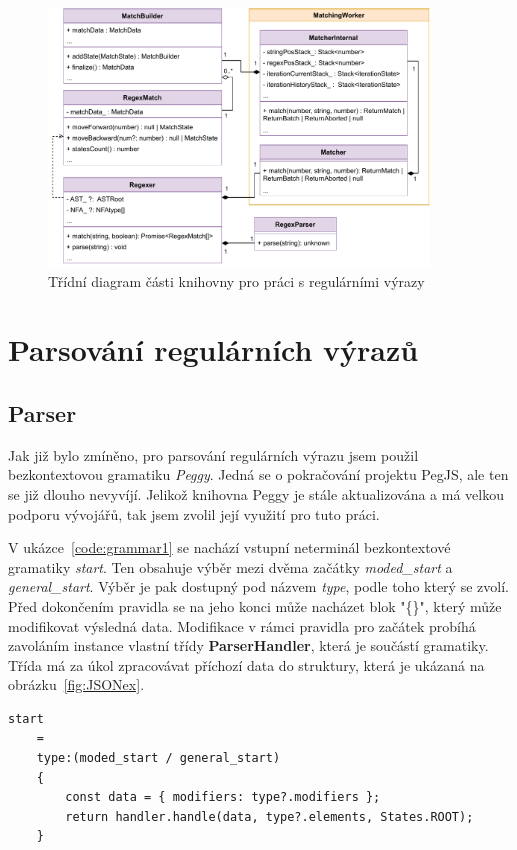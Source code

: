 \begin{figure}[!h]
	\centering
	\includegraphics[width=0.9\textwidth]{Figures/UML_RGXR.pdf}
	\caption{Třídní diagram části knihovny pro práci s regulárními výrazy}
	\label{fig:ARCH_RGXR}
\end{figure} 

\section{Parsování regulárních výrazů}\label{sec:Parse}

\subsection*{Parser}

Jak již bylo zmíněno, pro parsování regulárních výrazu jsem použil bezkontextovou gramatiku \textit{Peggy}.
Jedná se o pokračování projektu PegJS, ale ten se již dlouho nevyvíjí. 
Jelikož knihovna Peggy je stále aktualizována a má velkou podporu vývojářů, tak jsem zvolil její využití pro tuto práci.

V ukázce~\ref{code:grammar1} se nachází vstupní neterminál bezkontextové gramatiky \textit{start}. 
Ten obsahuje výběr mezi dvěma začátky \textit{moded\_start} a \textit{general\_start}.
Výběr je pak dostupný pod názvem \textit{type}, podle toho který se zvolí.
Před dokončením pravidla se na jeho konci může nacházet blok "\{\}", který může modifikovat výsledná data.
Modifikace v rámci pravidla pro začátek probíhá zavoláním instance vlastní třídy \textbf{ParserHandler}, která je součástí gramatiky.
Třída má za úkol zpracovávat příchozí data do struktury, která je ukázaná na obrázku~\ref{fig:JSONex}.

\begin{code}[!ht]
	\begin{verbatim}
start 
	= 
	type:(moded_start / general_start)
	{
		const data = { modifiers: type?.modifiers };
		return handler.handle(data, type?.elements, States.ROOT);
	}
	\end{verbatim}
	\caption{Jednoduché pravidlo gramatiky}
	\label{code:grammar1}
\end{code}

